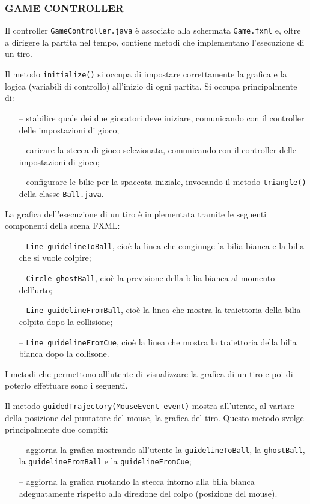 \documentclass[12pt,a4paper]{report}
\begin{document}
\subsubsection*{GAME CONTROLLER}
Il controller \texttt{GameController.java} è associato alla schermata \texttt{Game.fxml} e, oltre a dirigere la partita nel tempo, contiene metodi che implementano l'esecuzione di un tiro.

\vspace{3mm}

Il metodo \texttt{initialize()} si occupa di impostare correttamente la grafica e la logica (variabili di controllo) all'inizio di ogni partita.
Si occupa principalmente di:
\begin{itemize}
	\item [--] stabilire quale dei due giocatori deve iniziare, comunicando con il controller delle impostazioni di gioco;
	\item [--] caricare la stecca di gioco selezionata, comunicando con il controller delle impostazioni di gioco;
	\item [--] configurare le bilie per la spaccata iniziale, invocando il metodo \texttt{triangle()} della classe \texttt{Ball.java}.
\end{itemize}

\vspace{3mm}

La grafica dell'esecuzione di un tiro è implementata tramite le seguenti componenti della scena FXML:
\begin{itemize}
	\item [--] \texttt{Line guidelineToBall}, cioè la linea che congiunge la bilia bianca e la bilia che si vuole colpire;
	\item [--] \texttt{Circle ghostBall}, cioè la previsione della bilia bianca al momento dell'urto;
	\item [--] \texttt{Line guidelineFromBall}, cioè la linea che mostra la traiettoria della bilia colpita dopo la collisione;
	\item [--] \texttt{Line guidelineFromCue}, cioè la linea che mostra la traiettoria della bilia bianca dopo la collisone.
\end{itemize}
I metodi che permettono all'utente di visualizzare la grafica di un tiro e poi di poterlo effettuare sono i seguenti.

Il metodo \texttt{guidedTrajectory(MouseEvent event)} mostra all'utente, al variare della posizione del puntatore del mouse, la grafica del tiro.
Questo metodo svolge principalmente due compiti:
\begin{itemize}
	\item [--] aggiorna la grafica mostrando all'utente la \texttt{guidelineToBall}, la \texttt{ghostBall}, la \texttt{guidelineFromBall} e la \texttt{guidelineFromCue};
	\item [--] aggiorna la grafica ruotando la stecca intorno alla bilia bianca adeguatamente rispetto alla direzione del colpo (posizione del mouse).
\end{itemize}
\end{document}
